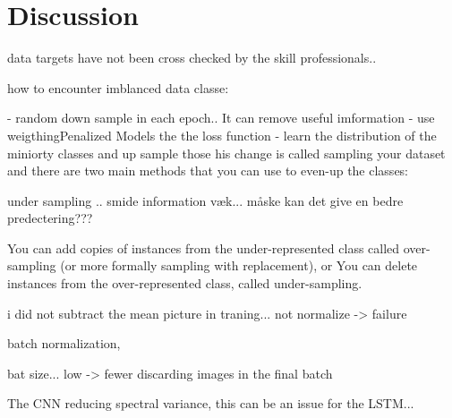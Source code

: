 \section{Discussion}
\label{sec:discussion}



data targets have not been cross checked by the skill professionals..


how to encounter imblanced data classe:

-  random down sample in each epoch.. It can remove useful imformation
- use weigthingPenalized Models the the loss function
- learn the distribution of the miniorty classes and up sample those
his change is called sampling your dataset and there are two main methods that you can use to even-up the classes:



under sampling .. smide information væk... måske kan det give en bedre predectering???




You can add copies of instances from the under-represented class called over-sampling (or more formally sampling with replacement), or
You can delete instances from the over-represented class, called under-sampling.



i did not subtract the mean picture in traning... not normalize -> failure


batch normalization,


bat size... low -> fewer discarding images in the final batch



The CNN reducing spectral variance, this can be an issue for the LSTM...